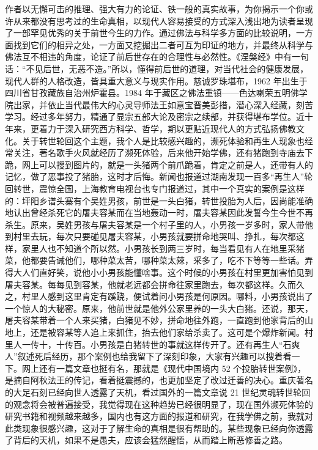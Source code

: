 \begin{book}
    作者以无懈可击的推理、强大有力的论证、铁一般的真实故事，为你揭示一个你或许从来都没有思考过的生命真相，以现代人容易接受的方式深入浅出地为读者呈现了一部罕见优秀的关于前世今生的力作。通过佛法与科学多方面的比较说明，一方面找到它们的相异之处，一方面又挖掘出二者可互为印证的地方，并最终从科学与佛法互不相违的角度，论证了前后世存在的合理性与必然性。《涅槃经》中有一句话：“不见后世，无恶不造。”所以，懂得前后世的道理，对当代社会的健康发展，现代人群的人格改造，皆具重大意义与现实作用。慈诚罗珠堪布，1962 年出生于四川省甘孜藏族自治州炉霍县。1984 年于藏区之佛法重镇——色达喇荣五明佛学院出家，并依止当代最伟大的心灵导师法王如意宝晋美彭措，潜心深入经藏，刻苦学习。经过多年努力，精通了显宗五部大论及密宗之续部，并获得堪布学位。近十年来，更着力于深入研究西方科学、哲学，期以更贴近现代人的方式弘扬佛教文化。关于转世轮回这个主题，我个人是比较感兴趣的，濒死体验和再生人现象也经常关注，著名歌手火风就经历了濒死体验，后来他开始学佛，还有猪跑到寺庙去下跪，网上可以搜到图片的，就是一头猪两个前爪跪着，肯定之前是人，还带有人的记忆，做了恶事投了猪胎，这时才后悔。新闻也报道过湖南发现一百多“再生人”轮回转世，震惊全国，上海教育电视台也专门报道过，其中一个真实的案例是这样的：坪阳乡谱头寨有个吴姓男孩，前世是一头白猪，转世投胎为人后，因尚能准确地认出曾经杀死它的屠夫容某而在当地轰动一时，屠夫容某因此发誓今生今世不再杀生。原来，吴姓男孩与屠夫容某是一个村子里的人，小男孩一岁多时，家人带他到村里去玩，每次只要碰见屠夫容某，小男孩就要拼命地哭叫、挣扎，每次都这样，家里人也不知道个所以然。小男孩长到两三岁时，每当看见有人在地里采猪菜，他都要告诫他们，哪种菜太苦，哪种菜太辣，采多了，吃不下等等一些话。弄得大人们直好笑，说他小小男孩能懂啥事。这个时候的小男孩在村里更加害怕见到屠夫容某。每每见到容某，他就老远都会拼命往家里跑去，每次都这样。久而久之，村里人感到这里肯定有蹊跷，便试着问小男孩是何原因。哪料，小男孩说出了一个惊人的大秘密。原来，他前世就是他外公家里养的一头大白猪。还说，那天，屠夫容某带着一个人来买猪，白猪见不妙，拼命地往外跑，一直跑到他家背后的山地上，还是被容某等人追上来抓住，抬去他们家给杀卖了。这可是个爆炸新闻。村里人一传十，十传百。小男孩是白猪转世的事就这样传开了。还有再生人“石爽人”叙述死后经历，那个案例也给我留下了深刻印象，大家有兴趣可以搜着看一下。网上还有一篇文章也挺有名，那就是《现代中国境内 52 个投胎转世案例》，是摘自阿秋法王的传记，看着挺震撼的，也更加坚定了改过迁善的决心。重庆著名的大足石刻已经向世人透露了天机，看过国外的一篇文章说 21 世纪灵魂转世轮回的观念将会被普遍接受，我觉得现在这种趋势已经很明显了，现在国外濒死体验的研究书籍和视频越来越多，国内也有这方面的报道和研究，在我学佛之前，我就对此类现象很感兴趣，这对于了解生命的真相是很有帮助的。某些现象已经向你透露了背后的天机，如果不是愚夫，应该会猛然醒悟，从而踏上断恶修善之路。
\end{book}
